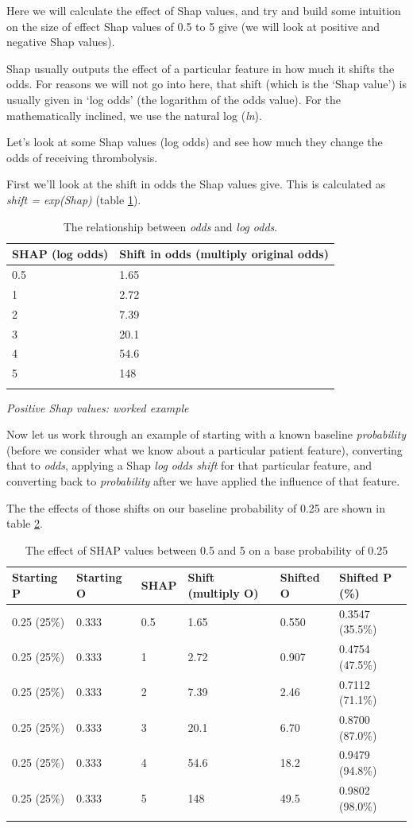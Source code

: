Here we will calculate the effect of Shap values, and try and build some
intuition on the size of effect Shap values of 0.5 to 5 give (we will
look at positive and negative Shap values).

Shap usually outputs the effect of a particular feature in how much it
shifts the odds. For reasons we will not go into here, that shift (which
is the `Shap value') is usually given in `log odds' (the logarithm of
the odds value). For the mathematically inclined, we use the natural log
(\emph{ln}).

Let's look at some Shap values (log odds) and see how much they change
the odds of receiving thrombolysis.

First we'll look at the shift in odds the Shap values give. This is
calculated as \emph{shift = exp(Shap)} (table \ref{tab:odds_1}).

\begin{minipage}{\textwidth}
\begin{longtable}[]{@{}ll@{}}
\caption{The relationship between \emph{odds} and \emph{log odds}.}\\
\toprule
SHAP (log odds) & Shift in odds (multiply original odds)\tabularnewline
\midrule
\endhead
0.5 & 1.65\tabularnewline
1 & 2.72\tabularnewline
2 & 7.39\tabularnewline
3 & 20.1\tabularnewline
4 & 54.6\tabularnewline
5 & 148\tabularnewline
\bottomrule
\label{tab:odds_1}
\end{longtable}
\end{minipage}

\emph{Positive Shap values: worked example}

Now let us work through an example of starting with a known baseline
\emph{probability} (before we consider what we know about a particular
patient feature), converting that to \emph{odds}, applying a Shap
\emph{log odds shift} for that particular feature, and converting back
to \emph{probability} after we have applied the influence of that
feature.

The the effects of those shifts on our baseline probability of 0.25 are shown in table \ref{tab:odds_2}.

\begin{minipage}{\textwidth}
\begin{longtable}[]{@{}llllll@{}}
\caption{The effect of SHAP values between 0.5 and 5 on a base probability of 0.25}\\
\toprule
Starting P & Starting O & SHAP & Shift (multiply O) & Shifted O &
Shifted P (\%)\tabularnewline
\midrule
\endhead
0.25 (25\%) & 0.333 & 0.5 & 1.65 & 0.550 & 0.3547
(35.5\%)\tabularnewline
0.25 (25\%) & 0.333 & 1 & 2.72 & 0.907 & 0.4754 (47.5\%)\tabularnewline
0.25 (25\%) & 0.333 & 2 & 7.39 & 2.46 & 0.7112 (71.1\%)\tabularnewline
0.25 (25\%) & 0.333 & 3 & 20.1 & 6.70 & 0.8700 (87.0\%)\tabularnewline
0.25 (25\%) & 0.333 & 4 & 54.6 & 18.2 & 0.9479 (94.8\%)\tabularnewline
0.25 (25\%) & 0.333 & 5 & 148 & 49.5 & 0.9802 (98.0\%)\tabularnewline
\bottomrule
\label{tab:odds_2}
\end{longtable}
\end{minipage}

